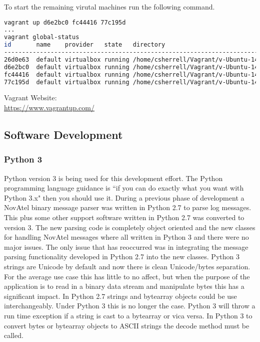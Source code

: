 To start the remaining virutal machines run the following command.
\begin{lstlisting}[language=bash]
vagrant up d6e2bc0 fc44416 77c195d
...
vagrant global-status
id       name    provider   state   directory
-----------------------------------------------------------------------------------------------
26d0e63  default virtualbox running /home/csherrell/Vagrant/v-Ubuntu-14.04-Bootstrap
d6e2bc0  default virtualbox running /home/csherrell/Vagrant/v-Ubuntu-14.04-Rabbit-02
fc44416  default virtualbox running /home/csherrell/Vagrant/v-Ubuntu-14.04-Rabbit-01
77c195d  default virtualbox running /home/csherrell/Vagrant/v-Ubuntu-14.04-Rabbit-Cassandra-01
\end{lstlisting}

\lstset{basicstyle=\normalfont}

\noindent
Vagrant Website:~\\
\url{https://www.vagrantup.com/}

\subsection{Software Development}
\subsubsection{Python 3}
Python version 3 is being used for this development effort. The Python programming language guidance is ``if you can do exactly what you want with Python 3.x" then you should use it. During a previous phase of development a NovAtel binary message parser was written in Python 2.7 to parse log messages. This plus some other support software written in Python 2.7 was converted to version 3. The new parsing code is completely object oriented and the new classes for handling NovAtel messages where all written in Python 3 and there were no major issues.  The only issue that has reoccurred was in integrating the message parsing functionality developed in Python 2.7 into the new classes. Python 3 strings are Unicode by default and now there is clean Unicode/bytes separation.  For the average use case this has little to no affect, but when the purpose of the application is to read in a binary data stream and manipulate bytes this has a significant impact.  In Python 2.7 strings and bytearray objects could be use interchangeably. Under Python 3 this is no longer the case. Python 3 will throw a run time exception if a string is cast to a bytearray or vica versa. In Python 3 to convert bytes or bytearray objects to ASCII strings the decode method must be called.

